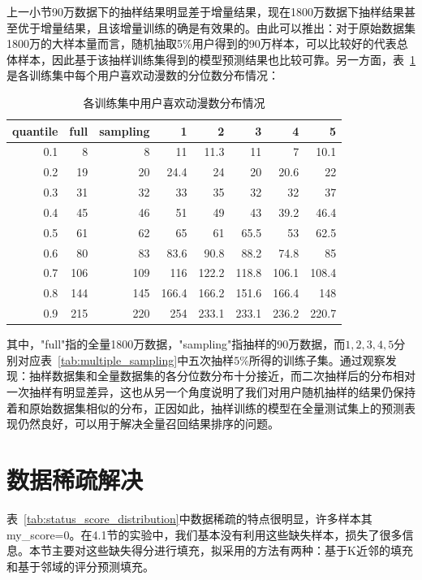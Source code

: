     上一小节90万数据下的抽样结果明显差于增量结果，现在1800万数据下抽样结果甚至优于增量结果，且该增量训练的确是有效果的。由此可以推出：对于原始数据集1800万的大样本量而言，随机抽取5\%用户得到的90万样本，可以比较好的代表总体样本，因此基于该抽样训练集得到的模型预测结果也比较可靠。另一方面，表~\ref{tab:liked_anime_quantile}是各训练集中每个用户喜欢动漫数的分位数分布情况：
    \begin{table}[htbp]
      \centering
      \caption{各训练集中用户喜欢动漫数分布情况}
      \begin{tabular}{rrrrrrrr}
        \toprule
        \multicolumn{1}{l}{quantile} & \multicolumn{1}{l}{full} & \multicolumn{1}{l}{sampling} & 1    & 2    & 3    & 4    & 5 \\
        \midrule
        0.1  & 8    & 8    & 11   & 11.3 & 11   & 7    & 10.1 \\
        0.2  & 19   & 20   & 24.4 & 24   & 20   & 20.6 & 22 \\
        0.3  & 31   & 32   & 33   & 35   & 32   & 32   & 37 \\
        0.4  & 45   & 46   & 51   & 49   & 43   & 39.2 & 46.4 \\
        0.5  & 61   & 62   & 65   & 61   & 65.5 & 53   & 62.5 \\
        0.6  & 80   & 83   & 83.6 & 90.8 & 88.2 & 74.8 & 85 \\
        0.7  & 106  & 109  & 116  & 122.2 & 118.8 & 106.1 & 108.4 \\
        0.8  & 144  & 145  & 166.4 & 166.2 & 151.6 & 166.4 & 148 \\
        0.9  & 215  & 220  & 254  & 233.1 & 233.1 & 236.2 & 220.7 \\
        \bottomrule
      \end{tabular}%
      \label{tab:liked_anime_quantile}%
    \end{table}%

    其中，"full"指的全量1800万数据，"sampling"指抽样的90万数据，而$1,2,3,4,5$分别对应表~\ref{tab:multiple_sampling}中五次抽样$5\%$所得的训练子集。通过观察发现：抽样数据集和全量数据集的各分位数分布十分接近，而二次抽样后的分布相对一次抽样有明显差异，这也从另一个角度说明了我们对用户随机抽样的结果仍保持着和原始数据集相似的分布，正因如此，抽样训练的模型在全量测试集上的预测表现仍然良好，可以用于解决全量召回结果排序的问题。

  \section{数据稀疏解决}
  表~\ref{tab:status_score_distribution}中数据稀疏的特点很明显，许多样本其my\_score=0。在4.1节的实验中，我们基本没有利用这些缺失样本，损失了很多信息。本节主要对这些缺失得分进行填充，拟采用的方法有两种：基于K近邻的填充和基于邻域的评分预测填充。
